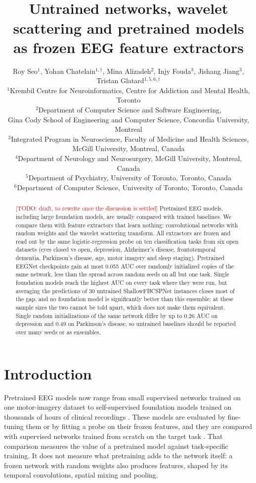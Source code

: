 \documentclass[11pt]{article}
\title{\todo{title}\\Untrained networks, wavelet scattering and pretrained models\\as frozen EEG feature extractors}
\author{Roy Seo$^{1}$, Yohan Chatelain$^{1,\dagger}$, Mina Alizadeh$^{2}$, Injy Fouda$^{3}$,
  Jishang Jiang$^{3}$, Tristan Glatard$^{1,5,6,\dagger}$\\[1ex]
  \small $^{1}$Krembil Centre for Neuroinformatics, Centre for Addiction and Mental Health, Toronto\\
  \small $^{2}$Department of Computer Science and Software Engineering,\\
  \small Gina Cody School of Engineering and Computer Science, Concordia University, Montreal\\
  \small $^{3}$Integrated Program in Neuroscience, Faculty of Medicine and Health Sciences,\\
  \small McGill University, Montreal, Canada\\
  \small $^{4}$Department of Neurology and Neurosurgery, McGill University, Montreal, Canada \todo{unused}\\
  \small $^{5}$Department of Psychiatry, University of Toronto, Toronto, Canada\\
  \small $^{6}$Department of Computer Science, University of Toronto, Toronto, Canada}
\date{}
\newcommand{\todo}[1]{\textcolor{red}{[TODO: #1]}}
\begin{document}
\maketitle

\begin{abstract}
\todo{draft, to rewrite once the discussion is settled}
Pretrained EEG models, including large foundation models, are usually compared with trained
baselines. We compare them with feature extractors that learn nothing: convolutional networks
with random weights and the wavelet scattering transform. All extractors are frozen and read
out by the same logistic-regression probe on ten classification tasks from six open datasets
(eyes closed vs open, depression, Alzheimer's disease, frontotemporal dementia, Parkinson's
disease, age, motor imagery and sleep staging). Pretrained EEGNet checkpoints gain at most
0.055 AUC over randomly initialized copies of the same network, less than the spread across
random seeds on all but one task. Single foundation models reach the highest AUC on every task where they were run,
but averaging the predictions of 30 untrained ShallowFBCSPNet instances closes most of the gap,
and no foundation model is significantly better than this ensemble; at these sample sizes the
two cannot be told apart, which does not make them equivalent. Single random initializations of the same network differ by up to 0.26 AUC on depression and
0.49 on Parkinson's disease, so untrained baselines should be reported over many seeds or as
ensembles.
\end{abstract}

\section{Introduction}
Pretrained EEG models now range from small supervised networks trained on one motor-imagery
dataset to self-supervised foundation models trained on thousands of hours of clinical
recordings \citep{kostas2021bendr, jiang2024labram, wang2024eegpt, wang2025cbramod}. These
models are evaluated by fine-tuning them or by fitting a probe on their frozen features, and they
are compared with supervised networks trained from scratch on the target task \citep{roy2019}.
That comparison measures the value of a pretrained model against task-specific training. It does
not measure what pretraining adds to the network itself: a frozen network with random weights also
produces features, shaped by its temporal convolutions, spatial mixing and pooling.
\end{document}
